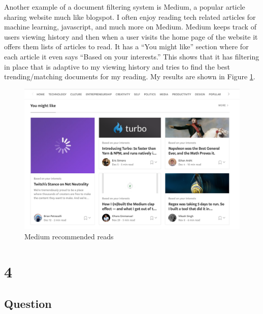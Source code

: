 \documentclass[letterpaper,11pt]{article}
\newcommand*{\srcPath}{../src}%
\begin{document}
Another example of a document filtering system is Medium, a popular article sharing website much like blogspot.
I often enjoy reading tech related articles for machine learning, javascript, and much more on Medium.
Medium keeps track of users viewing history and then when a user visits the home page of the website it offers them lists of articles to read.
It has a ``You might like'' section where for each article it even says ``Based on your interests.''
This shows that it has filtering in place that is adaptive to my viewing history and tries to find the best trending/matching documents for my reading.
My results are shown in Figure \ref{fig:med}.

\begin{figure}[h]
\centering
\includegraphics[scale=0.4]{medium.png}
\caption{Medium recommended reads}
\label{fig:med}
\end{figure}


% 

\clearpage


\section*{4}

\subsection*{Question}
\end{document}

